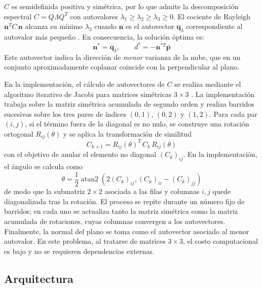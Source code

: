 $C$ es semidefinida positiva y simétrica, por lo que admite la
descomposición espectral $C = Q \Lambda Q^T$ con autovalores
$\lambda_1 \geq \lambda_2 \geq \lambda_3 \geq 0$. El cociente de Rayleigh
$\mathbf{n}^T C\, \mathbf{n}$ alcanza su mínimo $\lambda_3$ cuando
$\mathbf{n}$ es el autovector $\mathbf{q}_3$ correspondiente al autovalor
más pequeño \cite[App.~A4]{Hartley2004}. En consecuencia, la solución óptima es:
\begin{equation}
  \label{eq:plane-d}
  \mathbf{n}^* = \mathbf{q}_3, \qquad
  d^* = -\mathbf{n}^{*T} \bar{\mathbf{p}}
\end{equation}
Este autovector indica la dirección de \emph{menor} varianza de la nube, que
en un conjunto aproximadamente coplanar coincide con la perpendicular al
plano.

En la implementación, el cálculo de autovectores de $C$ se realiza mediante
el algoritmo iterativo de Jacobi para matrices simétricas $3 \times 3$
\cite{stroustrup2013cpp}. La implementación trabaja sobre la matriz
simétrica acumulada de segundo orden y realiza barridos sucesivos sobre los
tres pares de índices $(0,1)$, $(0,2)$ y $(1,2)$. Para cada par $(i,j)$,
si el término fuera de la diagonal es no nulo, se construye una rotación
ortogonal $R_{ij}(\theta)$ y se aplica la transformación de similitud
\begin{equation}
  \label{eq:jacobi-rotation}
  C_{k+1} = R_{ij}(\theta)^T\, C_k\, R_{ij}(\theta)
\end{equation}
con el objetivo de anular el elemento no diagonal $(C_k)_{ij}$. En la
implementación, el ángulo se calcula como
\begin{equation}
  \label{eq:jacobi-angle}
  \theta = \frac{1}{2}
  \operatorname{atan2}\!\left(2(C_k)_{ij}, (C_k)_{ii} - (C_k)_{jj}\right)
\end{equation}
de modo que la submatriz $2 \times 2$ asociada a las filas y columnas
$i,j$ quede diagonalizada tras la rotación. El proceso se repite durante un
número fijo de barridos; en cada uno se actualiza tanto la matriz simétrica
como la matriz acumulada de rotaciones, cuyas columnas convergen a los
autovectores. Finalmente, la normal del plano se toma como el autovector
asociado al menor autovalor. En este problema, al tratarse de matrices
$3 \times 3$, el costo computacional es bajo y no se requieren dependencias
externas.

\subsection{Arquitectura}

